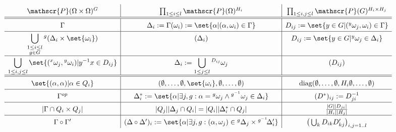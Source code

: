 \documentclass[fontsize=11pt,fleqn,a4paper]{scrartcl}
\begin{document}
\begin{landscape}

\begin{table}[htp]
\[\renewcommand{\arraystretch}{1.5}
\begin{array}{ c | c | c}
\mathscr{P}(\Omega\times\Omega)^G & \prod_{1\leq i\leq l} \mathscr{P}(\Omega)^{H_i} & \prod_{1\leq i,j\leq l} \mathscr{P}(G)^{H_i\times H_j} \\

\hline
\hline

\Gamma & \Delta_i:=\Gamma(\omega_i) := \set{\alpha | (\alpha,\omega_i)\in\Gamma} & D_{ij}:=\set{ y\in G | ({^y \omega_j},\omega_i)\in\Gamma} \\

\hline

\displaystyle\bigcup_{\substack{1\leq i\leq l \\ g\in G}} {^g(\Delta_i\times\set{\omega_i})} & (\Delta_i) & D_{ij}:=\set{y\in G | {^y \omega_j}\in\Delta_i} \\

\hline

\displaystyle\bigcup_{1\leq i,j\leq l}\set{({^x\omega_j}, {^y\omega_i}) | y^{-1}x \in D_{ij}} & \displaystyle\Delta_i:=\bigcup_{1\leq j\leq l} {^{D_{ij}}\omega_j} & (D_{ij}) \\

\hline
\hline

\set{(\alpha,\alpha) | \alpha\in Q_i} & (\emptyset,\ldots,\emptyset,\set{\omega_i},\emptyset,\ldots,\emptyset) &  \diag(\emptyset,\ldots,\emptyset,H_i\emptyset,\ldots,\emptyset) \\

\hline

\Gamma^{op} & \Delta_i^\ast:=\set{\alpha | \exists j,g: \alpha={^g\omega_j} \wedge {^{g^{-1}}\omega_j}\in\Delta_i} & (D^\ast)_{ij} := D_{ji}^{-1} \\

\hline

\abs{\Gamma \cap Q_i\times Q_j} & \abs{Q_j}\abs{\Delta_j\cap Q_i}=\abs{Q_i}\abs{\Delta_i^\ast\cap Q_j} & \frac{\abs{G}\abs{D_{ji}}}{\abs{H_i}\abs{H_j}} \\

\hline

\Gamma \circ \Gamma' & (\Delta \circ \Delta')_i := \set{\alpha | \exists j,g: (\alpha,\omega_j)\in{^g\Delta_j}\times{^{g^{-1}}\!\Delta_i'}} & \big(\bigcup_{k} D_{ik} D_{kj}'\big)_{i,j=1..l} \\


\end{array}\]
\end{table}
\end{landscape}
\end{document}
